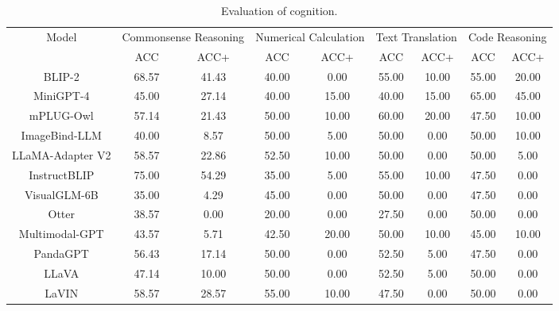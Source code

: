 \documentclass{article}
\begin{document}
\begin{table}[t]
    \centering
    \begin{center}
        \begin{adjustbox}{max width=0.85\textwidth}
            \begin{tabular}{c|cc|cc|cc|cc}
                \toprule
                \multirow{2}{*}{Model}&\multicolumn{2}{c|}{Commonsense Reasoning}&\multicolumn{2}{c|}{Numerical Calculation}&\multicolumn{2}{c|}{Text Translation}&\multicolumn{2}{c}{Code Reasoning}\\
                &ACC&ACC+&ACC&ACC+&ACC&ACC+&ACC&ACC+\\
                \midrule
                
                BLIP-2                 & 68.57&41.43 & 40.00&0.00  & 55.00&10.00 & 55.00&20.00 \\
                MiniGPT-4              & 45.00 &27.14  & 40.00 &15.00  & 40.00 &15.00 & 65.00 &45.00 \\
                mPLUG-Owl              & 57.14 &21.43  & 50.00&10.00  & 60.00&20.00 & 47.50&10.00 \\
                ImageBind-LLM          & 40.00 &8.57  & 50.00 &5.00   & 50.00 &0.00  & 50.00 &10.00  \\
                LLaMA-Adapter V2       & 58.57 &22.86  & 52.50&10.00   & 50.00 &0.00   & 50.00 &5.00  \\
                InstructBLIP           & 75.00&54.29 & 35.00&5.00  & 55.00&10.00 & 47.50&0.00  \\
                VisualGLM-6B           & 35.00 &4.29  & 45.00&0.00  & 50.00 &0.00  & 47.50 &0.00  \\
                Otter                  & 38.57 &0.00  & 20.00 &0.00  & 27.50 &0.00  & 50.00&0.00  \\
                Multimodal-GPT         & 43.57 &5.71  & 42.50 &20.00 & 50.00&10.00   & 45.00&10.00 \\
                PandaGPT               & 56.43&17.14 & 50.00&0.00  & 52.50&5.00  & 47.50&0.00  \\
                LLaVA                  & 47.14 &10.00  & 50.00&0.00  & 52.50&5.00  & 50.00&0.00  \\
                LaVIN                  & 58.57 &28.57  & 55.00 &10.00   & 47.50 &0.00   & 50.00 &0.00   \\
                
                \bottomrule
            \end{tabular}%
        \end{adjustbox}
    \end{center}
    \caption{Evaluation of cognition.}
    \label{table-3}
\end{table}




\end{document}
